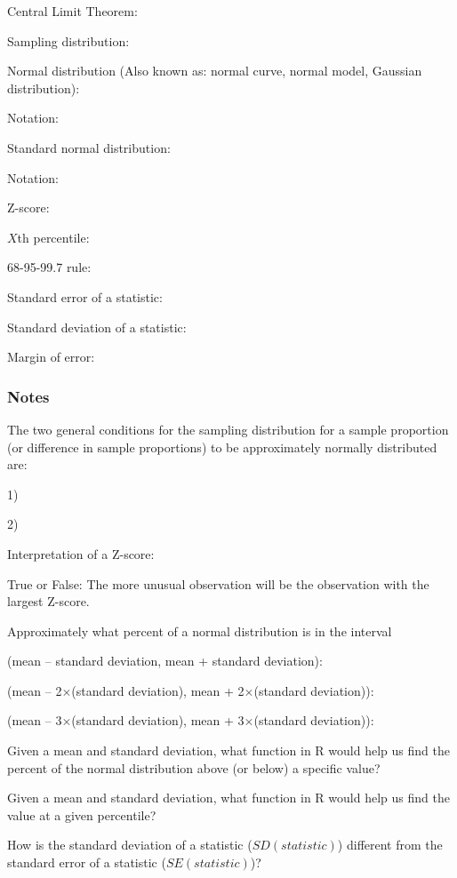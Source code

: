 \documentclass[
]{report}
\newcommand{\rgs}{\vspace{12pt}} %
\newcommand{\rgi}{\hspace{24pt}}  %
\begin{document}
Central Limit Theorem:
\rgs

Sampling distribution:
\rgs

Normal distribution (Also known as: normal curve, normal model, Gaussian distribution):
\rgs

\rgi Notation:
\rgs

Standard normal distribution:
\rgs

\rgi Notation:
\rgs

Z-score:
\rgs

\(X\)th percentile:
\rgs

68-95-99.7 rule:
\rgs

Standard error of a statistic:
\rgs

Standard deviation of a statistic:
\rgs

Margin of error:
\rgs

\hypertarget{notes-17}{%
\subsubsection*{Notes}\label{notes-17}}

The two general conditions for the sampling distribution for a sample proportion (or difference in sample proportions) to be approximately normally distributed are:

\rgi 1)
\rgs

\rgi 2)
\rgs

Interpretation of a Z-score:
\rgs

True or False: The more unusual observation will be the observation with the largest Z-score.

Approximately what percent of a normal distribution is in the interval

\rgi (mean -- standard deviation, mean + standard deviation):
\rgs

\rgi (mean -- 2\(\times\)(standard deviation), mean + 2\(\times\)(standard deviation)):
\rgs

\rgi (mean -- 3\(\times\)(standard deviation), mean + 3\(\times\)(standard deviation)):
\rgs

Given a mean and standard deviation, what function in R would help us find the percent of the normal distribution above (or below) a specific value?
\rgs

Given a mean and standard deviation, what function in R would help us find the value at a given percentile?
\rgs

How is the standard deviation of a statistic (\(SD(statistic)\)) different from the standard error of a statistic (\(SE(statistic)\))?
\rgs
\end{document}
